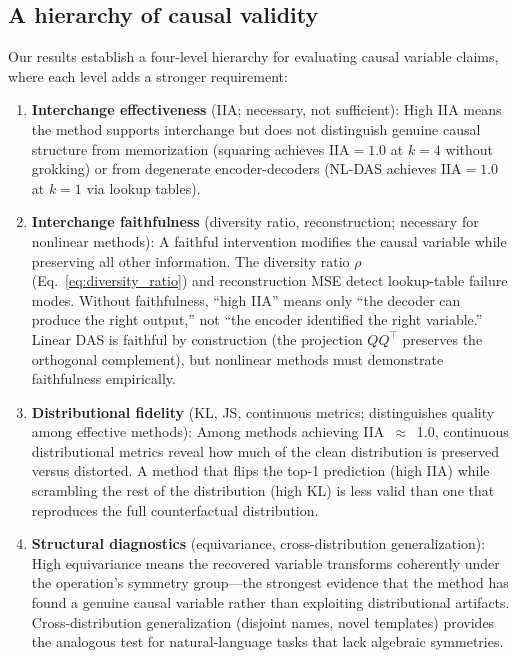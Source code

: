 \documentclass{article}
\newcommand{\IIA}{\mathrm{IIA}}
\begin{document}
\subsection{A hierarchy of causal validity}

Our results establish a four-level hierarchy for evaluating causal variable
claims, where each level adds a stronger requirement:

\begin{enumerate}
\item \textbf{Interchange effectiveness} (IIA; necessary, not sufficient): High
  IIA means the method supports interchange but does not distinguish genuine
  causal structure from memorization (squaring achieves $\IIA = 1.0$ at $k = 4$
  without grokking) or from degenerate encoder-decoders (NL-DAS achieves
  $\IIA = 1.0$ at $k = 1$ via lookup tables).

\item \textbf{Interchange faithfulness} (diversity ratio, reconstruction;
  necessary for nonlinear methods): A faithful intervention modifies the causal
  variable while preserving all other information. The diversity ratio
  $\rho$ (Eq.~\ref{eq:diversity_ratio}) and reconstruction MSE detect
  lookup-table failure modes. Without faithfulness, ``high IIA'' means only
  ``the decoder can produce the right output,'' not ``the encoder identified
  the right variable.'' Linear DAS is faithful by construction (the projection
  $QQ^\top$ preserves the orthogonal complement), but nonlinear methods must
  demonstrate faithfulness empirically.

\item \textbf{Distributional fidelity} (KL, JS, continuous metrics;
  distinguishes quality among effective methods): Among methods achieving
  IIA~$\approx$~1.0, continuous distributional metrics reveal how much of
  the clean distribution is preserved versus distorted. A method that flips
  the top-1 prediction (high IIA) while scrambling the rest of the distribution
  (high KL) is less valid than one that reproduces the full counterfactual
  distribution.

\item \textbf{Structural diagnostics} (equivariance, cross-distribution
  generalization): High equivariance means the recovered variable transforms
  coherently under the operation's symmetry group---the strongest evidence that
  the method has found a genuine causal variable rather than exploiting
  distributional artifacts. Cross-distribution generalization (disjoint names,
  novel templates) provides the analogous test for natural-language tasks that
  lack algebraic symmetries.
\end{enumerate}
\end{document}

